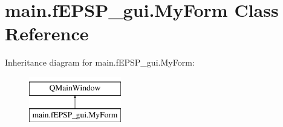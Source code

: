 \hypertarget{classmain_1_1f_e_p_s_p__gui_1_1_my_form}{\section{main.\-f\-E\-P\-S\-P\-\_\-gui.\-My\-Form Class Reference}
\label{classmain_1_1f_e_p_s_p__gui_1_1_my_form}
}
Inheritance diagram for main.\-f\-E\-P\-S\-P\-\_\-gui.\-My\-Form\-:\begin{figure}[H]
\begin{center}
\leavevmode
\includegraphics[height=2.000000cm]{classmain_1_1f_e_p_s_p__gui_1_1_my_form}
\end{center}
\end{figure}
